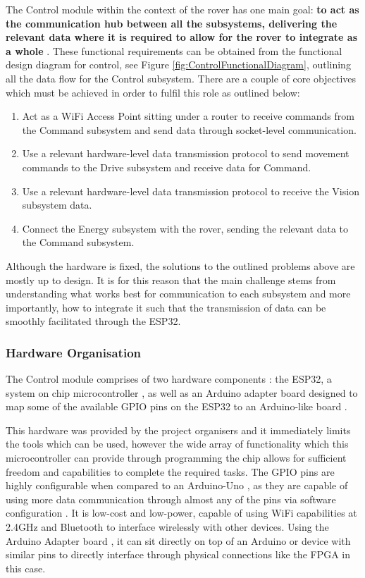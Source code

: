 \documentclass[a4paper]{article}
\begin{document}
The Control module within the context of the rover has one main goal: 
\textbf{to act as the communication hub between all the subsystems, delivering
the relevant data where it is required to allow for the rover to integrate
as a whole} \cite{MarsRoverSpec}.  These functional requirements can be 
obtained from the functional design diagram for control, see Figure \ref{fig:ControlFunctionalDiagram}, outlining all the 
data flow for the Control subsystem. There are a couple of core objectives 
which must be achieved in order to fulfil this role as outlined below:

\begin{enumerate}
    \item Act as a WiFi Access Point sitting under a router to receive
    commands from the Command subsystem and send data through 
    socket-level communication.
    \item Use a relevant hardware-level data transmission protocol to
    send movement commands to the Drive subsystem and receive data for 
    Command. 
    \item Use a relevant hardware-level data transmission protocol to 
    receive the Vision subsystem data.
    \item Connect the Energy subsystem with the rover, sending the 
    relevant data to the Command subsystem.
\end{enumerate}

Although the hardware is fixed, the solutions to the outlined problems
above are mostly up to design. It is for this reason that the main 
challenge stems from understanding what works best for communication 
to each subsystem and more importantly, how to integrate it such that 
the transmission of data can be smoothly facilitated through the ESP32.

\subsubsection{Hardware Organisation}

The Control module comprises of two hardware components \cite{BoxContent}: 
the ESP32, a system on chip microcontroller \cite{ESP32Datasheet}, as 
well as an Arduino adapter board designed to map some of the available 
GPIO pins on the ESP32 to an Arduino-like board \cite{ESP32ArduinoAdapter}.

This hardware was provided by the project organisers and it immediately 
limits the tools which can be used, however the wide array of functionality 
which this microcontroller can provide through programming the chip allows
for sufficient freedom and capabilities to complete the required tasks. The
GPIO pins are highly configurable when compared to an Arduino-Uno 
\cite{MicrocontrollerComparison}, as they are capable of using more data 
communication through almost any of the pins via software configuration 
\cite{ESP32PinOut}. It is low-cost and low-power, capable of using 
WiFi capabilities at 2.4GHz and Bluetooth \cite{ESP32Datasheet} to 
interface wirelessly with other devices. Using the Arduino Adapter 
board \cite{ESP32ArduinoAdapter}, it can sit directly on top of an 
Arduino or device with similar pins to directly interface through 
physical connections like the FPGA in this case. 
\end{document}
